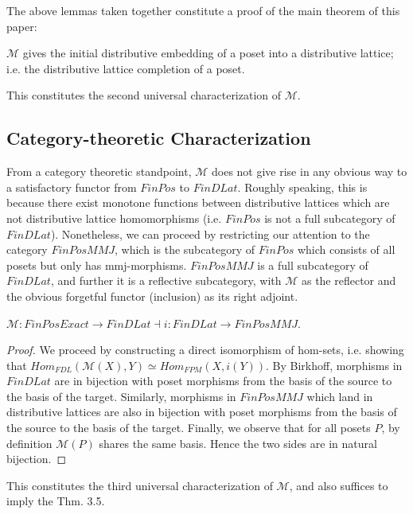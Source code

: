 \documentclass[hoptionsi,review,format=sigplan]{acmart}
\theoremstyle{definition}
\newcommand{\Mcc}{\mathcal{M}}
\begin{document}
The above lemmas taken together constitute a proof of the main theorem of this paper:
\begin{theorem}

\(\Mcc\) gives the initial distributive embedding of a poset into a distributive lattice; i.e. the distributive lattice completion of a poset.
\end{theorem}

This constitutes the second universal characterization of \(\Mcc\).

\subsection{Category-theoretic Characterization}

From a category theoretic standpoint, \(\Mcc\) does not give rise in any obvious way to a satisfactory functor from \(FinPos\) to \(FinDLat\). Roughly speaking, this is because there exist monotone functions between distributive lattices which are not distributive lattice homomorphisms (i.e. \(FinPos\) is not a full subcategory of \(FinDLat\)). Nonetheless, we can proceed by restricting our attention to the category \(FinPosMMJ\), which is the subcategory of \(FinPos\) which consists of all posets but only has mmj-morphisms. \(FinPosMMJ\) is a full subcategory of \(FinDLat\), and further it is a reflective subcategory, with \(\Mcc\) as the reflector and the obvious forgetful functor (inclusion) as its right adjoint. 

\begin{theorem}
\(\Mcc : FinPosExact \rightarrow FinDLat \allowbreak  \dashv \allowbreak i : FinDLat \rightarrow FinPosMMJ\).
\end{theorem}

\begin{proof}
We proceed by constructing a direct isomorphism of hom-sets, i.e. showing that \(Hom_{FDL}(\Mcc(X),Y) \allowbreak \simeq \allowbreak Hom_{FPM}(X,i(Y))\). By Birkhoff, morphisms in \(FinDLat\) are in bijection with poset morphisms from the basis of the source to the basis of the target. Similarly, morphisms in \(FinPosMMJ\) which land in distributive lattices are also in bijection with poset morphisms from the basis of the source to the basis of the target. Finally, we observe that for all posets \(P\), by definition \(\Mcc(P)\) shares the same basis. Hence the two sides are in natural bijection.
\end{proof}
This constitutes the third universal characterization of \(\Mcc\), and also suffices to imply the Thm. 3.5. 
\end{document}

